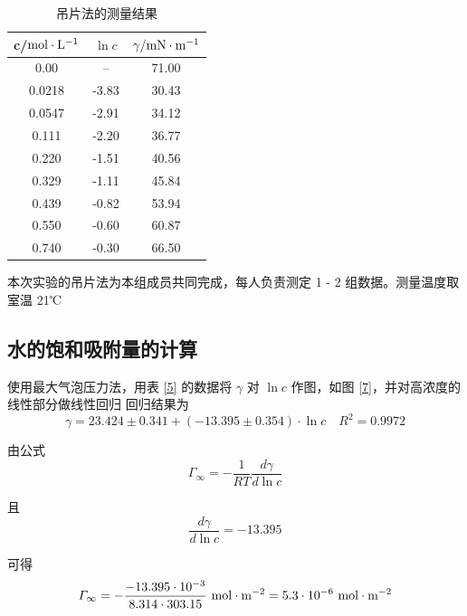 \documentclass[cn,hazy,pku,12pt,normal,math=newtx,cite=super]{elegantnote}
\begin{document}
\begin{table}[h]
    \centering
    \caption{吊片法的测量结果}
    \label{6}
    \begin{tabular}{ccc}
    \hline
    c/$\rm   mol \cdot L^{-1}$ & $\ln c$ & $\gamma / {\rm mN \cdot m^{-1}}$ \\ \hline
    0.00                       & --      & 71.00                            \\
    0.0218                     & -3.83   & 30.43                            \\
    0.0547                     & -2.91   & 34.12                            \\
    0.111                      & -2.20   & 36.77                            \\
    0.220                      & -1.51   & 40.56                            \\
    0.329                      & -1.11   & 45.84                            \\
    0.439                      & -0.82   & 53.94                            \\
    0.550                      & -0.60   & 60.87                            \\
    0.740                      & -0.30   & 66.50                            \\ \hline
    \end{tabular}
\end{table}

本次实验的吊片法为本组成员共同完成，每人负责测定 1 - 2 组数据。测量温度取室温 21℃

\subsection{水的饱和吸附量的计算}

使用最大气泡压力法，用表 \ref{5} 的数据将 $\gamma$ 对 $\ln c$ 作图，如图 \ref{7}，并对高浓度的线性部分做线性回归
回归结果为 
$$
\gamma = 23.424 \pm 0.341 + ( - 13.395 \pm 0.354) \cdot \ln c
\quad R^2 = 0.9972
$$



由公式
$$
    \varGamma_\infty = - \frac{1}{RT} \frac{d \gamma}{d \ln c}
$$

且
$$
    \frac{d \gamma}{d \ln c} = - 13.395
$$

可得
$$
    \varGamma_\infty = - \frac{ - 13.395 \cdot 10^{-3} }{8.314 \cdot 303.15 } {\rm\ mol \cdot m^{-2}} = 5.3 \cdot 10^{-6} {\rm\ mol \cdot m^{-2}}
$$
\end{document}
